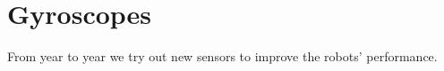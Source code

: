 



\section{Gyroscopes}

From year to year we try out new sensors to improve the robots'
performance.







